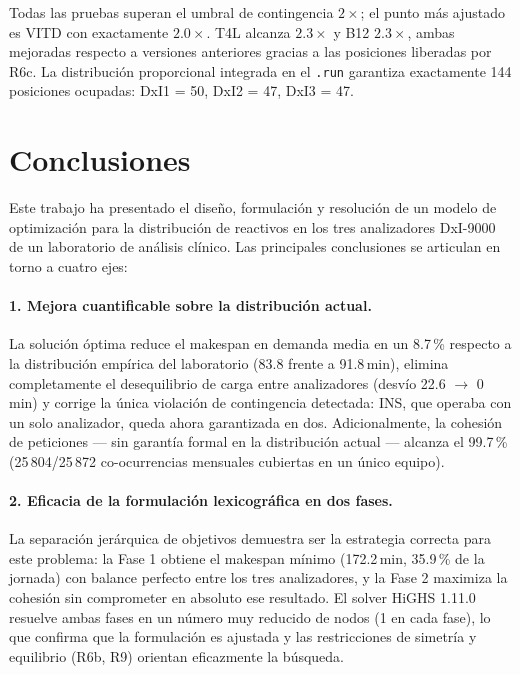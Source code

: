 \documentclass[12pt, a4paper]{article}
\begin{document}
Todas las pruebas superan el umbral de contingencia $2\times$; el punto más ajustado es
VITD con exactamente $2.0\times$. T4L alcanza $2.3\times$ y B12 $2.3\times$, ambas
mejoradas respecto a versiones anteriores gracias a las posiciones liberadas por R6c. La
distribución proporcional integrada en el \texttt{.run} garantiza exactamente 144
posiciones ocupadas: DxI1 = 50, DxI2 = 47, DxI3 = 47.

\clearpage
\section{Conclusiones}

Este trabajo ha presentado el diseño, formulación y resolución de un modelo de
optimización para la distribución de reactivos en los tres analizadores DxI-9000 de un
laboratorio de análisis clínico. Las principales conclusiones se articulan en torno a
cuatro ejes:

\paragraph{1. Mejora cuantificable sobre la distribución actual.}
La solución óptima reduce el makespan en demanda media en un 8.7\,\% respecto a la
distribución empírica del laboratorio (83.8 frente a 91.8\,min), elimina completamente
el desequilibrio de carga entre analizadores (desvío 22.6 $\to$ 0\,min) y corrige la
única violación de contingencia detectada: INS, que operaba con un solo analizador,
queda ahora garantizada en dos. Adicionalmente, la cohesión de peticiones --- sin
garantía formal en la distribución actual --- alcanza el 99.7\,\% (25\,804/25\,872
co-ocurrencias mensuales cubiertas en un único equipo).

\paragraph{2. Eficacia de la formulación lexicográfica en dos fases.}
La separación jerárquica de objetivos demuestra ser la estrategia correcta para este
problema: la Fase 1 obtiene el makespan mínimo (172.2\,min, 35.9\,\% de la jornada)
con balance perfecto entre los tres analizadores, y la Fase 2 maximiza la cohesión
sin comprometer en absoluto ese resultado. El solver HiGHS 1.11.0 resuelve ambas
fases en un número muy reducido de nodos (1 en cada fase), lo que confirma que la
formulación es ajustada y las restricciones de simetría y equilibrio (R6b, R9)
orientan eficazmente la búsqueda.
\end{document}
